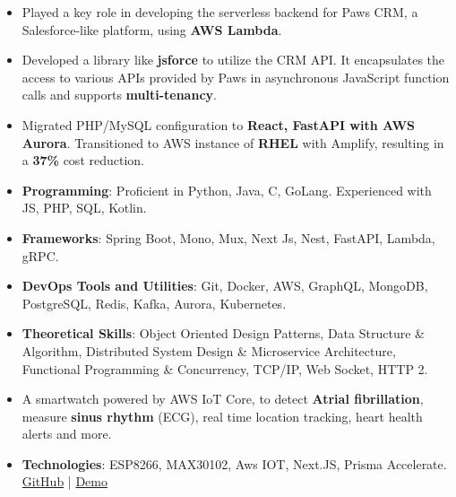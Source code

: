 
\begin{itemize}[itemsep=6pt]
\normalsize

\item Played a key role in developing the serverless backend for Paws CRM, a Salesforce-like platform, using \textbf{AWS Lambda}. 

\item Developed a library like \textbf{jsforce} to utilize the CRM API. It encapsulates the access to various APIs provided by Paws in asynchronous JavaScript function calls and supports \textbf{multi-tenancy}.

\end{itemize}
\vspace{6pt}



\begin{itemize}[itemsep=6pt]
\normalsize

\item Migrated PHP/MySQL configuration to \textbf{React, FastAPI with AWS Aurora}. Transitioned to AWS instance of \textbf{RHEL} with
Amplify, resulting in a \textbf{37\%} cost reduction.

\end{itemize}

\smallskip
\begin{itemize}
\normalsize
\item \textbf{Programming}: Proficient in Python, Java, C, GoLang. Experienced with JS, PHP, SQL, Kotlin.
\smallskip
\item \textbf{Frameworks}: Spring Boot, Mono, Mux, Next Js, Nest, FastAPI, Lambda, gRPC.
\smallskip
\item \textbf{DevOps Tools and Utilities}: Git, Docker, AWS, GraphQL, MongoDB, PostgreSQL, Redis, Kafka, Aurora, Kubernetes.
\smallskip
\item \textbf{Theoretical Skills}: Object Oriented Design Patterns, Data Structure \& Algorithm, Distributed System Design \& Microservice Architecture, Functional Programming \& Concurrency, TCP/IP, Web Socket, HTTP 2.
\smallskip
\end{itemize}
  
\begin{itemize}
\normalsize

\item A smartwatch powered by AWS IoT Core, to detect \textbf{Atrial fibrillation}, measure \textbf{sinus rhythm} (ECG), real time location tracking, heart health alerts and more.

\item \textbf{Technologies}: ESP8266, MAX30102, Aws IOT, Next.JS, Prisma Accelerate.\\
\textcolor{blue}{\href{https://github.com/shaiq-dev/panic-alarm}{GitHub}} | \textcolor{blue}{\href{https://panicalarm.shaiqkar.dev}{Demo}}

\end{itemize}
\smallskip
\smallskip


